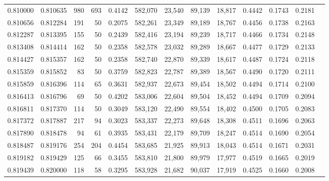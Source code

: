 \begin{tabular}{rrrrrrrrrrrrr}
0.810000 & 0.810635 &   980 & 693 &                                     0.4142 & 582,070 &  23,540 &  89,139 &  18,817 & 0.4442 & 0.1743 & 0.2181 \\
0.810656 & 0.812284 &   191 &  50 &                                     0.2075 & 582,261 &  23,349 &  89,189 &  18,767 & 0.4456 & 0.1738 & 0.2163 \\
0.812287 & 0.813395 &   155 &  50 &                                     0.2439 & 582,416 &  23,194 &  89,239 &  18,717 & 0.4466 & 0.1734 & 0.2148 \\
0.813408 & 0.814414 &   162 &  50 &                                     0.2358 & 582,578 &  23,032 &  89,289 &  18,667 & 0.4477 & 0.1729 & 0.2133 \\
0.814427 & 0.815357 &   162 &  50 &                                     0.2358 & 582,740 &  22,870 &  89,339 &  18,617 & 0.4487 & 0.1724 & 0.2118 \\
0.815359 & 0.815852 &    83 &  50 &                                     0.3759 & 582,823 &  22,787 &  89,389 &  18,567 & 0.4490 & 0.1720 & 0.2111 \\
0.815859 & 0.816396 &   114 &  65 &                                     0.3631 & 582,937 &  22,673 &  89,454 &  18,502 & 0.4494 & 0.1714 & 0.2100 \\
0.816413 & 0.816796 &    69 &  50 &                                     0.4202 & 583,006 &  22,604 &  89,504 &  18,452 & 0.4494 & 0.1709 & 0.2094 \\
0.816811 & 0.817370 &   114 &  50 &                                     0.3049 & 583,120 &  22,490 &  89,554 &  18,402 & 0.4500 & 0.1705 & 0.2083 \\
0.817372 & 0.817887 &   217 &  94 &                                     0.3023 & 583,337 &  22,273 &  89,648 &  18,308 & 0.4511 & 0.1696 & 0.2063 \\
0.817890 & 0.818478 &    94 &  61 &                                     0.3935 & 583,431 &  22,179 &  89,709 &  18,247 & 0.4514 & 0.1690 & 0.2054 \\
0.818487 & 0.819176 &   254 & 204 &                                     0.4454 & 583,685 &  21,925 &  89,913 &  18,043 & 0.4514 & 0.1671 & 0.2031 \\
0.819182 & 0.819429 &   125 &  66 &                                     0.3455 & 583,810 &  21,800 &  89,979 &  17,977 & 0.4519 & 0.1665 & 0.2019 \\
0.819439 & 0.820000 &   118 &  58 &                                     0.3295 & 583,928 &  21,682 &  90,037 &  17,919 & 0.4525 & 0.1660 & 0.2008 \\

\end{tabular}
